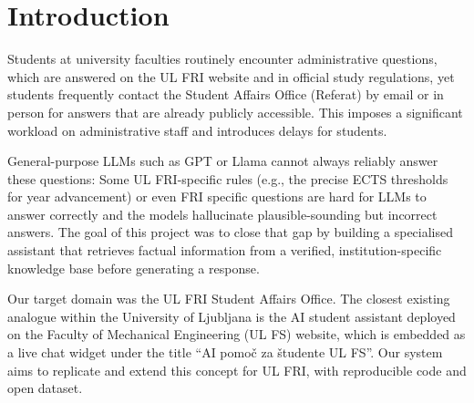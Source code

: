 \documentclass[fleqn,moreauthors,10pt]{ds_report}
\affiliation{\textit{Advisors: Slavko Žitnik}}
\begin{document}
\flushbottom

\maketitle

\thispagestyle{empty}


\section*{Introduction}
Students at university faculties routinely encounter administrative questions,
which are answered on the UL FRI website and in official study regulations,
yet students frequently contact the Student Affairs Office (Referat) by email or in person
for answers that are already publicly accessible.
This imposes a significant workload on administrative staff and introduces delays for students.

General-purpose LLMs such as GPT or Llama cannot always reliably answer these questions:
Some UL FRI-specific rules (e.g., the precise ECTS thresholds for year advancement) or even FRI specific questions
are hard for LLMs to answer correctly and the models hallucinate plausible-sounding but incorrect answers.
The goal of this project was to close that gap by building a specialised assistant
that retrieves factual information from a verified, institution-specific knowledge base
before generating a response.

Our target domain was the UL FRI Student Affairs Office.
The closest existing analogue within the University of Ljubljana is the AI student assistant
deployed on the Faculty of Mechanical Engineering (UL FS) website,
which is embedded as a live chat widget under the title ``AI pomoč za študente UL FS''.
Our system aims to replicate and extend this concept for UL FRI,
with reproducible code and open dataset.

\end{document}
